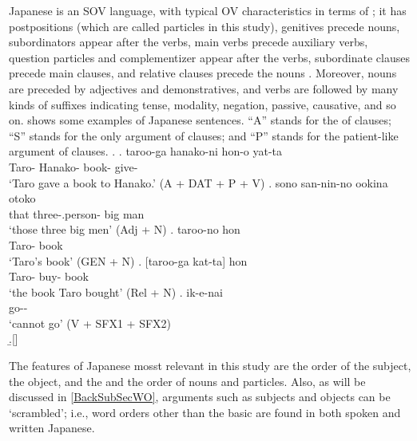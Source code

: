 Japanese is an SOV language, with typical OV characteristics
in terms of ;
it has postpositions (which are called particles in this study),
genitives precede nouns,
 subordinators appear after the verbs,
main verbs precede auxiliary verbs,
question particles and complementizer appear after the verbs,
subordinate clauses precede main clauses, and
relative clauses precede the nouns
\cite{shibatani90,masuokatakubo92}.
Moreover,
nouns are preceded by adjectives and demonstratives,
and verbs are followed by many kinds of suffixes indicating tense, modality, negation, passive, causative, and so on.
\Next shows some examples of Japanese sentences.
``A'' stands for the  of  clauses;
``S'' stands for the only argument of  clauses; and
``P'' stands for the patient-like argument of  clauses.
%
\ex.
     \ag. taroo-ga hanako-ni hon-o yat-ta \\
        Taro- Hanako- book- give- \\
        `Taro gave a book to Hanako.' \hfill{(A + DAT + P + V)}
     \bg. sono san-nin-no ookina otoko \\
          that three-.person- big man \\
          `those three big men' \hfill{(Adj + N)}
     \bg. taroo-no hon \\
          Taro- book \\
          `Taro's book' \hfill{(GEN + N)}
     \bg. [taroo-ga kat-ta] hon \\
           Taro- buy- book \\
           `the book Taro bought' \hfill{(Rel + N)}
     \bg. ik-e-nai \\
          go-- \\
          `cannot go' \hfill{(V + SFX1 + SFX2)} \\
     \b.[] \hfill{\cite[257--258, glosses modified by NN]{shibatani90}}

The features of Japanese mosst relevant in this study are the order of the subject, the object, and the  and the order of nouns and particles.
Also, as will be discussed in \ref{BackSubSecWO},
arguments such as subjects and objects can be `scrambled';
i.e., word orders other than the basic  are found in both spoken and written Japanese.


